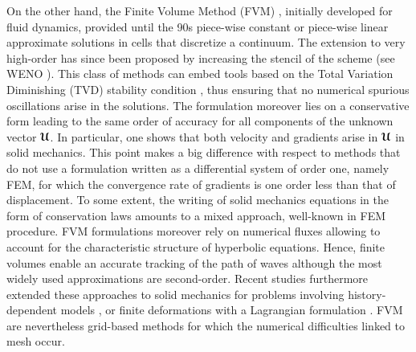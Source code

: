 On the other hand, the Finite Volume Method (FVM) \cite{Leveque}, initially developed for fluid dynamics, provided until the 90s piece-wise constant or piece-wise linear approximate solutions in cells that discretize a continuum.
The extension to very high-order has since been proposed by increasing the stencil of the scheme (see WENO \cite{WENO}).
This class of methods can embed tools based on the Total Variation Diminishing (TVD) stability condition \cite{Harten}, thus ensuring that no numerical spurious oscillations arise in the solutions. 
The formulation moreover lies on a conservative form leading to the same order of accuracy for all components of the unknown vector ${\boldsymbol{\mathcal{U}}}$.
In particular, one shows that both velocity and gradients arise in ${\boldsymbol{\mathcal{U}}}$ in solid mechanics.
This point makes a big difference with respect to methods that do not use a formulation written as a differential system of order one, namely FEM, for which the convergence rate of gradients is one order less than that of displacement.
To some extent, the writing of solid mechanics equations in the form of conservation laws amounts to a mixed approach, well-known in FEM procedure.
FVM formulations moreover rely on numerical fluxes allowing to account for the characteristic structure of hyperbolic equations.
Hence, finite volumes enable an accurate tracking of the path of waves although the most widely used approximations are second-order. %
Recent studies furthermore extended these approaches to solid mechanics for problems involving history-dependent models \cite{Gavrilyuk,Thomas_EP}, or finite deformations with a Lagrangian formulation \cite{Lee_FVM,Haider_FVM}.
FVM are nevertheless grid-based methods for which the numerical difficulties linked to mesh occur.

